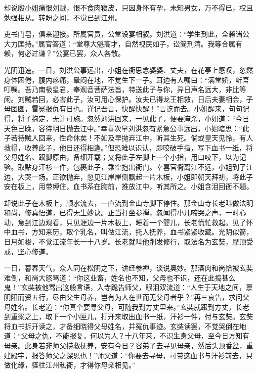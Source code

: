 \documentclass[12pt]{lsbook}
\begin{document}
却说殷小姐痛恨刘贼，恨不食肉寝皮，只因身怀有孕，未知男女，万不得已，权且勉强相从。转盼之间，不觉已到江州。

吏书门皂，俱来迎接。所属官员，公堂设宴相叙。刘洪道：“学生到此，全赖诸公大力匡持。”属官答道：“堂尊大魁高才，自然视民如子，讼简刑清。我等合属有赖，何必过谦？”公宴已罢，众人各散。

光阴迅速。一日，刘洪公事远出，小姐在衙思念婆婆、丈夫，在花亭上感叹，忽然身体困倦，腹内疼痛，晕闷在地，不觉生下一子。耳边有人嘱曰：“满堂娇，听吾叮嘱。吾乃南极星君，奉观音菩萨法旨，特送此子与你，异日声名远大，非比等闲。刘贼若回，必害此子，汝可用心保护。汝夫已得龙王相救，日后夫妻相会，子母团圆，雪冤报仇有日也。谨记吾言，快醒快醒！”言讫而去。小姐醒来，句句记得，将子抱定，无计可施。忽然刘洪回来，一见此子，便要淹杀，小姐道：“今日天色已晚，容待明日抛去江中。”幸喜次早刘洪忽有紧急公事远出，小姐暗思：“此子若待贼人回来，性命休矣！不如及早抛弃江中，听其生死。倘或皇天见怜，有人救得，收养此子，他日还得相逢。”但恐难以识认，即咬破手指，写下血书一纸，将父母姓名、跟脚原由，备细开载；又将此子左脚上一个小指，用口咬下，以为记验。取贴身汗衫一件，包裹此子，乘空抱出衙门。幸喜官衙离江不远，小姐到了江边，大哭一场。正欲抛弃，忽见江岸岸侧飘起一片木板，小姐即朝天拜祷，将此子安在板上，用带缚住，血书系在胸前，推放江中，听其所之。小姐含泪回衙不题。

却说此子在木板上，顺水流去，一直流到金山寺脚下停住。那金山寺长老叫做法明和尚，修真悟道，已得无生妙诀。正当打坐参禅，忽闻得小儿啼哭之声，一时心动，急到江边观看，只见涯边一片木板上，睡着一个婴儿，长老慌忙救起。见了怀中血书，方知来历，取个乳名，叫做江流，托人抚养，血书紧紧收藏。光阴似箭，日月如梭，不觉江流年长一十八岁。长老就叫他削发修行，取法名为玄奘，摩顶受戒，坚心修道。

一日，暮春天气，众人同在松阴之下，讲经参禅，谈说奥妙。那酒肉和尚恰被玄奘难倒，和尚大怒骂道：“你这业畜，姓名也不知，父母也不识，还在此捣甚么鬼！”玄奘被他骂出这般言语，入寺跪告师父，眼泪双流道：“人生于天地之间，禀阴阳而资五行，尽由父生母养，岂有为人在世而无父母者乎？”再三哀告，求问父母姓名。长老道：“你真个要寻父母，可随我到方丈里来。”玄奘就跟到方丈，长老到重梁之上，取下一个小匣儿，打开来取出血书一纸，汗衫一件，付与玄奘。玄奘将血书拆开读之，才备细晓得父母姓名，并冤仇事迹。玄奘读罢，不觉哭倒在地道：“父母之仇，不能报复，何以为人？十八年来，不识生身父母，至今日方知有母亲。此身若非师父捞救抚养，安有今日？容弟子去寻见母亲，然后头顶香盆，重建殿宇，报答师父之深恩也！”师父道：“你要去寻母，可带这血书与汗衫前去，只做化缘，径往江州私衙，才得你母亲相见。”
\end{document}

